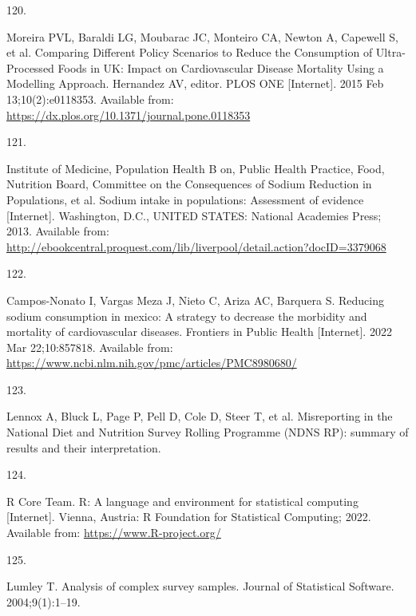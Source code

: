 \documentclass[
]{article}
\newlength{\cslhangindent}
\newlength{\csllabelwidth}
\newlength{\cslentryspacingunit} %
\newenvironment{CSLReferences}[2] %
 {%
  \setlength{\parindent}{0pt}
  \ifodd #1
  \let\oldpar\par
  \def\par{\hangindent=\cslhangindent\oldpar}
  \fi
  \setlength{\parskip}{#2\cslentryspacingunit}
 }%
 {}
\newcommand{\CSLLeftMargin}[1]{\parbox[t]{\csllabelwidth}{#1}}
\newcommand{\CSLRightInline}[1]{\parbox[t]{\linewidth - \csllabelwidth}{#1}\break}
\begin{document}
\begin{CSLReferences}{0}{0}
\leavevmode{}%
\CSLLeftMargin{120. }%
\CSLRightInline{Moreira PVL, Baraldi LG, Moubarac JC, Monteiro CA,
Newton A, Capewell S, et al. Comparing Different Policy Scenarios to
Reduce the Consumption of Ultra-Processed Foods in UK: Impact on
Cardiovascular Disease Mortality Using a Modelling Approach. Hernandez
AV, editor. PLOS ONE {[}Internet{]}. 2015 Feb 13;10(2):e0118353.
Available from: \url{https://dx.plos.org/10.1371/journal.pone.0118353}}

\leavevmode{}%
\CSLLeftMargin{121. }%
\CSLRightInline{Institute of Medicine, Population Health B on, Public
Health Practice, Food, Nutrition Board, Committee on the Consequences of
Sodium Reduction in Populations, et al. Sodium intake in populations:
Assessment of evidence {[}Internet{]}. Washington, D.C., UNITED STATES:
National Academies Press; 2013. Available from:
\url{http://ebookcentral.proquest.com/lib/liverpool/detail.action?docID=3379068}}

\leavevmode{}%
\CSLLeftMargin{122. }%
\CSLRightInline{Campos-Nonato I, Vargas Meza J, Nieto C, Ariza AC,
Barquera S. Reducing sodium consumption in mexico: A strategy to
decrease the morbidity and mortality of cardiovascular diseases.
Frontiers in Public Health {[}Internet{]}. 2022 Mar 22;10:857818.
Available from:
\url{https://www.ncbi.nlm.nih.gov/pmc/articles/PMC8980680/}}

\leavevmode{}%
\CSLLeftMargin{123. }%
\CSLRightInline{Lennox A, Bluck L, Page P, Pell D, Cole D, Steer T, et
al. Misreporting in the National Diet and Nutrition Survey Rolling
Programme (NDNS RP): summary of results and their interpretation. }

\leavevmode{}%
\CSLLeftMargin{124. }%
\CSLRightInline{R Core Team. {R}: A language and environment for
statistical computing {[}Internet{]}. Vienna, Austria: R Foundation for
Statistical Computing; 2022. Available from:
\url{https://www.R-project.org/}}

\leavevmode{}%
\CSLLeftMargin{125. }%
\CSLRightInline{Lumley T. Analysis of complex survey samples. Journal of
Statistical Software. 2004;9(1):1--19. }

\end{CSLReferences}
\end{document}
